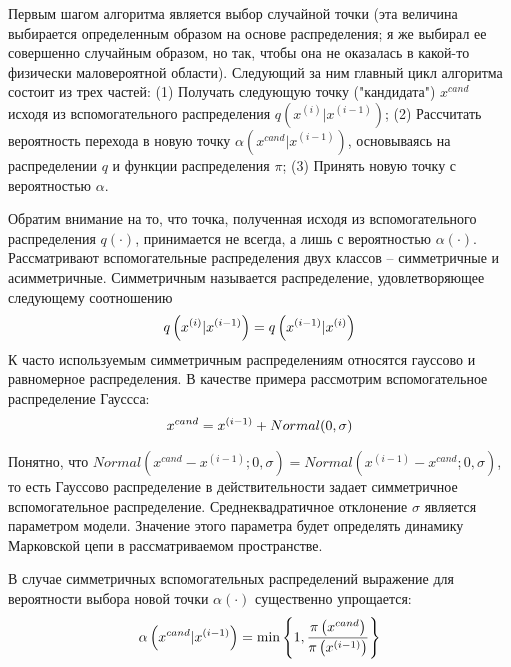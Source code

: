 \documentclass[12pt]{article}
\newcommand{\lb}{\left(}
\newcommand{\rb}{\right)}
\begin{document}
Первым шагом алгоритма является выбор случайной точки (эта величина выбирается определенным образом на основе распределения; я же выбирал ее совершенно случайным образом, но так, чтобы она не оказалась в какой-то физически маловероятной области). Следующий за ним главный цикл алгоритма состоит из трех частей: (1) Получать следующую точку ("кандидата") $x^{cand}$ исходя из вспомогательного распределения $q \lb x^{(i)} | x^{(i-1)} \rb$; (2) Рассчитать вероятность перехода в новую точку $\alpha \lb x^{cand} | x^{(i-1)} \rb$, основываясь на распределении $q$ и функции распределения $\pi$; (3) Принять новую точку с вероятностью $\alpha$. \par
Обратим внимание на то, что точка, полученная исходя из вспомогательного распределения $q(\cdot)$, принимается не всегда, а лишь с вероятностью $\alpha \lb \cdot \rb$. Рассматривают вспомогательные распределения двух классов -- симметричные и асимметричные. Симметричным называется распределение, удовлетворяющее следующему соотношению
\begin{gather}
		q \lb x^{(i)} | x^{(i-1)} \rb = q \lb x^{(i-1)} | x^{(i)} \rb \notag
\end{gather}
К часто используемым симметричным распределениям относятся гауссово и равномерное распределения. В качестве примера рассмотрим вспомогательное распределение Гауссса: 
\begin{gather}
		x^{cand} = x^{(i-1)} + Normal(0, \sigma) \notag
\end{gather}

Понятно, что $Normal( x^{cand} - x^{(i-1)}; 0, \sigma ) = Normal( x^{(i-1)} - x^{cand}; 0, \sigma)$, то есть Гауссово распределение в действительности задает симметричное вспомогательное распределение. Среднеквадратичное отклонение $\sigma$ является параметром модели. Значение этого параметра будет определять динамику Марковской цепи в рассматриваемом пространстве. \par
В случае симметричных вспомогательных распределений выражение для вероятности выбора новой точки $\alpha(\cdot)$ существенно упрощается:
\begin{gather}
		\alpha \lb x^{cand} | x^{(i-1)} \rb = \min \left\{ 1, \frac{\pi \lb x^{cand} \rb}{\pi \lb x^{(i - 1)} \rb} \right\} \notag 
\end{gather}
\end{document}

